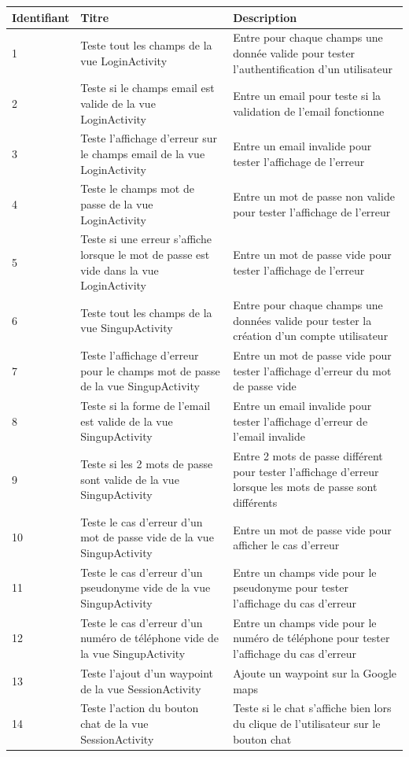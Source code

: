 \documentclass[titlepage, 12pt]{report}
\begin{document}
\begin{table}[ht]
\begin{tabularx}{\textwidth}{|X|X|X|}
	\hline
	Identifiant & Titre & Description \\
	\hline
	1 & Teste tout les champs de la vue LoginActivity & Entre pour chaque champs une donnée valide pour tester l'authentification d'un utilisateur \\
	\hline
	2 & Teste si le champs email est valide de la vue LoginActivity & Entre un email pour teste si la validation de l'email fonctionne \\	
	\hline
	3 & Teste l'affichage d'erreur sur le champs email de la vue LoginActivity & Entre un email invalide pour tester l'affichage de l'erreur \\
	\hline
	4 & Teste le champs mot de passe de la vue LoginActivity & Entre un mot de passe non valide pour tester l'affichage de l'erreur \\
	\hline
	5 & Teste si une erreur s'affiche lorsque le mot de passe est vide dans la vue LoginActivity & Entre un mot de passe vide pour tester l'affichage de l'erreur \\
	\hline
	6 & Teste tout les champs de la vue SingupActivity & Entre pour chaque champs une données valide pour tester la création d'un compte utilisateur \\
	\hline
	7 & Teste l'affichage d'erreur pour le champs mot de passe de la vue SingupActivity & Entre un mot de passe vide pour tester l'affichage d'erreur du mot de passe vide \\
	\hline
	8 & Teste si la forme de l'email est valide de la vue SingupActivity & Entre un email invalide pour tester l'affichage d'erreur de l'email invalide  \\
	\hline
	9 & Teste si les 2 mots de passe sont valide de la vue SingupActivity & Entre 2 mots de passe différent pour tester l'affichage d'erreur lorsque les mots de passe sont différents \\
	\hline
	10 & Teste le cas d'erreur d'un mot de passe vide de la vue SingupActivity & Entre un mot de passe vide pour afficher le cas d'erreur  \\
	\hline
	11 & Teste le cas d'erreur d'un pseudonyme vide de la vue SingupActivity & Entre un champs vide pour le pseudonyme pour tester l'affichage du cas d'erreur \\
	\hline
	12 & Teste le cas d'erreur d'un numéro de téléphone vide de la vue SingupActivity & Entre un champs vide pour le numéro de téléphone pour tester l'affichage du cas d'erreur  \\
	\hline
	13 & Teste l'ajout d'un waypoint de la vue SessionActivity & Ajoute un waypoint sur la Google maps  \\
	\hline
	14 & Teste l'action du bouton chat de la vue SessionActivity & Teste si le chat s'affiche bien lors du clique de l'utilisateur sur le bouton chat  \\
	\hline \hline
\end{tabularx}
\end{table}
\end{document}

